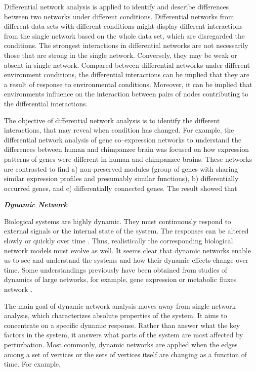 Differential network analysis is applied to identify and describe differences between two networks under different conditions. Differential networks from different data sets with different conditions might display different interactions from the single network based on the whole data set, which are disregarded the conditions. The strongest interactions in differential networks are not necessarily those that are strong in the single network. Conversely, they may be weak or absent in single network. Compared between differential networks under different environment conditions, the differential interactions can be implied that they are a result of response to environmental conditions. Moreover, it can be implied that environments influence on the interaction between pairs of nodes contributing to the differential interactions. 

The objective of differential network analysis is to identify the different interactions, that may reveal when condition has changed. For example, the differential network analysis of gene co--expression networks to understand the differences between human and chimpanzee brain was focused on how expression patterns of genes were different in human and chimpanzee brains. These networks are contrasted to find a) non-preserved modules (group of genes with sharing similar expression profiles and presumably similar functions), b) differentially occurred genes, and c) differentially connected genes. The result showed that 

\textbf{\textit{Dynamic Network}}

Biological systems are highly dynamic. They must continuously respond to external signals or the internal state of the system. The responses can be altered slowly or quickly over time \citep{Peer:2011jd}. Thus, realistically the corresponding biological network models must evolve as well. It seems clear that dynamic networks enable us to see and understand the systems and how their dynamic effects change over time. Some understandings previously have been obtained from studies of dynamics of large networks, for example, gene expression or metabolic fluxes network \citep{Idekerdiffnet}.

The main goal of dynamic network analysis moves away from single network analysis, which characterizes absolute properties of the system. It aims to concentrate on a specific dynamic response. Rather than answer what the key factors in the system, it answers what parts of the system are most affected by perturbation. Most commonly, dynamic networks are applied when the edges among a set of vertices or the sets of vertices itself are changing as a function of time. For example, 


